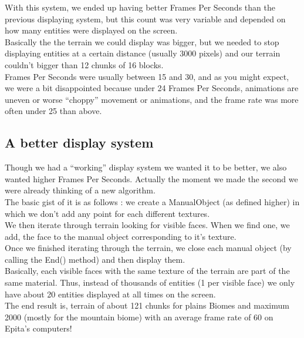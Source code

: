 \documentclass[article]{report}         %
\begin{document}
        With this system, we ended up having better Frames Per Seconds than the previous displaying system, but this count was very variable and depended on how many entities were displayed on the screen.\\
        
        Basically the the terrain we could display was bigger, but we needed to stop displaying entities at a certain distance (usually 3000 pixels) and our terrain couldn't bigger than 12 chunks of 16 blocks.\\

        Frames Per Seconds were usually between 15 and 30, and as you might expect, we were a bit disappointed because under 24 Frames Per Seconds, animations are uneven or worse ``choppy'' movement or animations, and the frame rate was more often under 25 than above.\\

        \subsection{A better display system}
          Though we had a ``working'' display system we wanted it to be better, we also wanted higher Frames Per Seconds. Actually the moment we made the second we were already thinking of a new algorithm.\\

          The basic gist of it is as follows : we create a ManualObject (as defined higher) in which we don't add any point for each different textures.\\
          We then iterate through terrain looking for visible faces. When we find one, we add, the face to the manual object corresponding to it's texture.\\
          Once we finished iterating through the terrain, we close each manual object (by calling the End() method) and then display them.\\

          Basically, each visible faces with the same texture of the terrain are part of the same material. Thus, instead of thousands of entities (1 per visible face) we only have about 20 entities displayed at all times on the screen.\\

          The end result is, terrain of about 121 chunks for plains Biomes and maximum 2000 (mostly for the mountain biome) with an average frame rate of 60 on Epita's computers!\\
\end{document}
